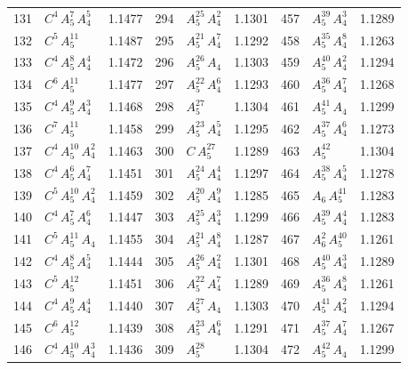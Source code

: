 \begin{longtable}{@{}rlr@{\quad}rlr@{\quad}rlr@{}}
131 & $C^{4}$\,$A_{5}^{7}$\,$A_{4}^{5}$ & 1.1477 & 294 & $A_{5}^{25}$\,$A_{4}^{2}$ & 1.1301 & 457 & $A_{5}^{39}$\,$A_{4}^{3}$ & 1.1289 \\
132 & $C^{5}$\,$A_{5}^{11}$ & 1.1487 & 295 & $A_{5}^{21}$\,$A_{4}^{7}$ & 1.1292 & 458 & $A_{5}^{35}$\,$A_{4}^{8}$ & 1.1263 \\
133 & $C^{4}$\,$A_{5}^{8}$\,$A_{4}^{4}$ & 1.1472 & 296 & $A_{5}^{26}$\,$A_{4}$ & 1.1303 & 459 & $A_{5}^{40}$\,$A_{4}^{2}$ & 1.1294 \\
134 & $C^{6}$\,$A_{5}^{11}$ & 1.1477 & 297 & $A_{5}^{22}$\,$A_{4}^{6}$ & 1.1293 & 460 & $A_{5}^{36}$\,$A_{4}^{7}$ & 1.1268 \\
135 & $C^{4}$\,$A_{5}^{9}$\,$A_{4}^{3}$ & 1.1468 & 298 & $A_{5}^{27}$ & 1.1304 & 461 & $A_{5}^{41}$\,$A_{4}$ & 1.1299 \\
136 & $C^{7}$\,$A_{5}^{11}$ & 1.1458 & 299 & $A_{5}^{23}$\,$A_{4}^{5}$ & 1.1295 & 462 & $A_{5}^{37}$\,$A_{4}^{6}$ & 1.1273 \\
137 & $C^{4}$\,$A_{5}^{10}$\,$A_{4}^{2}$ & 1.1463 & 300 & $C$\,$A_{5}^{27}$ & 1.1289 & 463 & $A_{5}^{42}$ & 1.1304 \\
138 & $C^{4}$\,$A_{5}^{6}$\,$A_{4}^{7}$ & 1.1451 & 301 & $A_{5}^{24}$\,$A_{4}^{4}$ & 1.1297 & 464 & $A_{5}^{38}$\,$A_{4}^{5}$ & 1.1278 \\
139 & $C^{5}$\,$A_{5}^{10}$\,$A_{4}^{2}$ & 1.1459 & 302 & $A_{5}^{20}$\,$A_{4}^{9}$ & 1.1285 & 465 & $A_{6}$\,$A_{5}^{41}$ & 1.1283 \\
140 & $C^{4}$\,$A_{5}^{7}$\,$A_{4}^{6}$ & 1.1447 & 303 & $A_{5}^{25}$\,$A_{4}^{3}$ & 1.1299 & 466 & $A_{5}^{39}$\,$A_{4}^{4}$ & 1.1283 \\
141 & $C^{5}$\,$A_{5}^{11}$\,$A_{4}$ & 1.1455 & 304 & $A_{5}^{21}$\,$A_{4}^{8}$ & 1.1287 & 467 & $A_{6}^{2}$\,$A_{5}^{40}$ & 1.1261 \\
142 & $C^{4}$\,$A_{5}^{8}$\,$A_{4}^{5}$ & 1.1444 & 305 & $A_{5}^{26}$\,$A_{4}^{2}$ & 1.1301 & 468 & $A_{5}^{40}$\,$A_{4}^{3}$ & 1.1289 \\
143 & $C^{5}$\,$A_{5}^{12}$ & 1.1451 & 306 & $A_{5}^{22}$\,$A_{4}^{7}$ & 1.1289 & 469 & $A_{5}^{36}$\,$A_{4}^{8}$ & 1.1261 \\
144 & $C^{4}$\,$A_{5}^{9}$\,$A_{4}^{4}$ & 1.1440 & 307 & $A_{5}^{27}$\,$A_{4}$ & 1.1303 & 470 & $A_{5}^{41}$\,$A_{4}^{2}$ & 1.1294 \\
145 & $C^{6}$\,$A_{5}^{12}$ & 1.1439 & 308 & $A_{5}^{23}$\,$A_{4}^{6}$ & 1.1291 & 471 & $A_{5}^{37}$\,$A_{4}^{7}$ & 1.1267 \\
146 & $C^{4}$\,$A_{5}^{10}$\,$A_{4}^{3}$ & 1.1436 & 309 & $A_{5}^{28}$ & 1.1304 & 472 & $A_{5}^{42}$\,$A_{4}$ & 1.1299 \\

\end{longtable}
